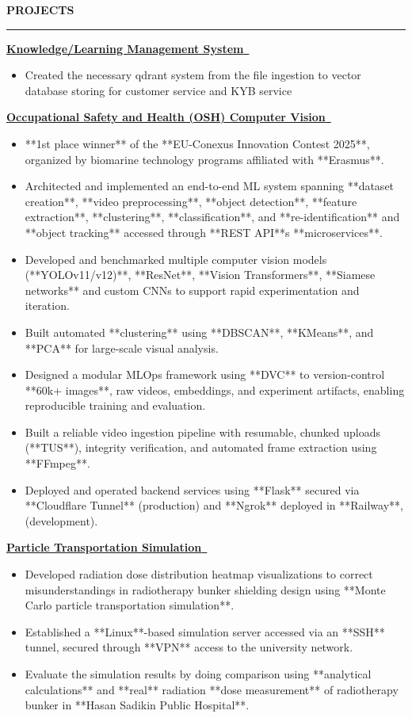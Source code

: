 \documentclass[11pt,letterpaper]{article}
\newenvironment{rSection}[1]{%
  \sectionskip
  \MakeUppercase{\bf#1}
  \sectionlineskip
  \hrule
  \begin{list}{}{\setlength{\leftmargin}{1.5em}}
  \item[]
}{%
  \end{list}
}
\def\sectionlineskip{\medskip}
\def\sectionskip{\medskip}
\begin{document}
\begin{rSection}{Projects}
\href{https://Summon and Radikari owned}{\textbf{Knowledge/Learning Management System}~\faLink}

\begin{itemize}
\itemsep -0.45em
\item Created the necessary qdrant system from the file ingestion to vector database storing for customer service and KYB service
\end{itemize}


\href{https://Summon owned}{\textbf{Occupational Safety and Health (OSH) Computer Vision}~\faLink}

\begin{itemize}
\itemsep -0.45em
\item **1st place winner** of the **EU-Conexus Innovation Contest 2025**, organized by biomarine technology programs affiliated with **Erasmus**.
\item Architected and implemented an end-to-end ML system spanning **dataset creation**, **video preprocessing**, **object detection**, **feature extraction**, **clustering**, **classification**, and **re-identification** and **object tracking** accessed through **REST API**s **microservices**.
\item Developed and benchmarked multiple computer vision models (**YOLOv11/v12)**, **ResNet**, **Vision Transformers**, **Siamese networks** and custom CNNs to support rapid experimentation and iteration.
\item Built automated **clustering** using **DBSCAN**, **KMeans**, and **PCA** for large-scale visual analysis.
\item Designed a modular MLOps framework using **DVC** to version-control **60k+ images**, raw videos, embeddings, and experiment artifacts, enabling reproducible training and evaluation.
\item Built a reliable video ingestion pipeline with resumable, chunked uploads (**TUS**), integrity verification, and automated frame extraction using **FFmpeg**.
\item Deployed and operated backend services using **Flask** secured via **Cloudflare Tunnel** (production) and **Ngrok** deployed in **Railway**,  (development).
\end{itemize}


\href{https://portfolio.aryahanif.xyz/linac_dose}{\textbf{Particle Transportation Simulation}~\faLink}

\begin{itemize}
\itemsep -0.45em
\item Developed radiation dose distribution heatmap visualizations to correct misunderstandings in radiotherapy bunker shielding design using **Monte Carlo particle transportation simulation**.
\item Established a **Linux**-based simulation server accessed via an **SSH** tunnel, secured through **VPN** access to the university network.
\item Evaluate the simulation results by doing comparison using **analytical calculations** and **real** radiation **dose measurement** of radiotherapy bunker in **Hasan Sadikin Public Hospital**.
\end{itemize}



\end{rSection}
\end{document}
